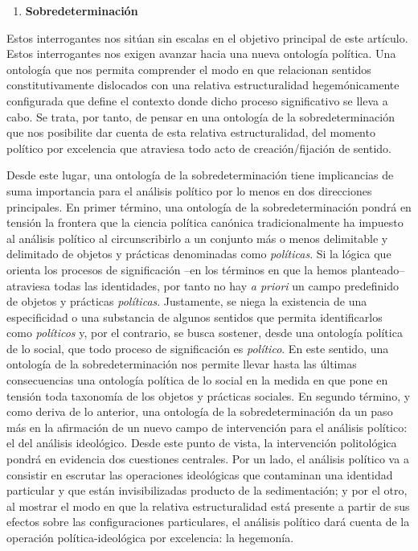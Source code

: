 \begin{enumerate}
\def\labelenumi{\arabic{enumi}.}
\item
  \textbf{Sobredeterminación}
\end{enumerate}

Estos interrogantes nos sitúan sin escalas en el objetivo principal de este artículo. Estos interrogantes nos exigen avanzar hacia una nueva ontología política. Una ontología que nos permita comprender el modo en que relacionan sentidos constitutivamente dislocados con una relativa estructuralidad hegemónicamente configurada que define el contexto donde dicho proceso significativo se lleva a cabo. Se trata, por tanto, de pensar en una ontología de la sobredeterminación que nos posibilite dar cuenta de esta relativa estructuralidad, del momento político por excelencia que atraviesa todo acto de creación/fijación de sentido.

Desde este lugar, una ontología de la sobredeterminación tiene implicancias de suma importancia para el análisis político por lo menos en dos direcciones principales. En primer término, una ontología de la sobredeterminación pondrá en tensión la frontera que la ciencia política canónica tradicionalmente ha impuesto al análisis político al circunscribirlo a un conjunto más o menos delimitable y delimitado de objetos y prácticas denominadas como \emph{políticas}. Si la lógica que orienta los procesos de significación --en los términos en que la hemos planteado-- atraviesa todas las identidades, por tanto no hay \emph{a priori} un campo predefinido de objetos y prácticas \emph{políticas}. Justamente, se niega la existencia de una especificidad o una substancia de algunos sentidos que permita identificarlos como \emph{políticos} y, por el contrario, se busca sostener, desde una ontología política de lo social, que todo proceso de significación es \emph{político}. En este sentido, una ontología de la sobredeterminación nos permite llevar hasta las últimas consecuencias una ontología política de lo social en la medida en que pone en tensión toda taxonomía de los objetos y prácticas sociales. En segundo término, y como deriva de lo anterior, una ontología de la sobredeterminación da un paso más en la afirmación de un nuevo campo de intervención para el análisis político: el del análisis ideológico. Desde este punto de vista, la intervención politológica pondrá en evidencia dos cuestiones centrales. Por un lado, el análisis político va a consistir en escrutar las operaciones ideológicas que contaminan una identidad particular y que están invisibilizadas producto de la sedimentación; y por el otro, al mostrar el modo en que la relativa estructuralidad está presente a partir de sus efectos sobre las configuraciones particulares, el análisis político dará cuenta de la operación política-ideológica por excelencia: la hegemonía.

